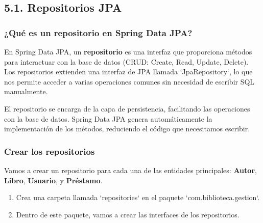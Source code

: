 \documentclass[11pt]{article}
\begin{document}
\subsection{5.1. Repositorios JPA}
\label{sec:org9e264fa}

\subsubsection{¿Qué es un repositorio en Spring Data JPA?}
\label{sec:org3c94414}
En Spring Data JPA, un \textbf{\textbf{repositorio}} es una interfaz que proporciona métodos para interactuar con la base de datos (CRUD: Create, Read, Update, Delete). Los repositorios extienden una interfaz de JPA llamada `JpaRepository`, lo que nos permite acceder a varias operaciones comunes sin necesidad de escribir SQL manualmente.

El repositorio se encarga de la capa de persistencia, facilitando las operaciones con la base de datos. Spring Data JPA genera automáticamente la implementación de los métodos, reduciendo el código que necesitamos escribir.

\subsubsection{Crear los repositorios}
\label{sec:orge786563}
Vamos a crear un repositorio para cada una de las entidades principales: \textbf{\textbf{Autor}}, \textbf{\textbf{Libro}}, \textbf{\textbf{Usuario}}, y \textbf{\textbf{Préstamo}}.

\begin{enumerate}
\item Crea una carpeta llamada `repositories` en el paquete `com.biblioteca.gestion`.

\item Dentro de este paquete, vamos a crear las interfaces de los repositorios.
\end{enumerate}
\end{document}
